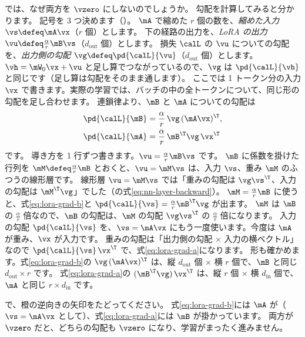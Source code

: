 では、なぜ両方を $\vzero$ にしないのでしょうか。
勾配を計算してみると分かります。
記号を 3 つ決めます（）。
$\mA$ で縮めた $r$ 個の数を、\emph{縮めた入力} $\vs\defeq\mA\vx$（$r$ 個）とします。
下の経路の出力を、\emph{LoRA の出力} $\vu\defeq\frac{\alpha}{r}\mB\vs$（$d_{\text{out}}$ 個）とします。
損失 $\calL$ の $\vu$ についての勾配を、\emph{出力側の勾配} $\vg\defeq\pd{\calL}{\vu}$（$d_{\text{out}}$ 個）とします。
$\vh=\mW_0\vx+\vu$ と足し算でつながっているので、$\vg$ は $\pd{\calL}{\vh}$ と同じです（足し算は勾配をそのまま通します）。
ここでは 1 トークン分の入力 $\vx$ で書きます。実際の学習では、バッチの中の全トークンについて、同じ形の勾配を足し合わせます。
連鎖律より、$\mB$ と $\mA$ についての勾配は
\begin{align}
\pd{\calL}{\mB}&=\frac{\alpha}{r}\,\vg\,(\mA\vx)^\T, \label{eq:lora-grad-b}\\
\pd{\calL}{\mA}&=\frac{\alpha}{r}\,\mB^\T\vg\,\vx^\T \label{eq:lora-grad-a}
\end{align}
です。
導き方を 1 行ずつ書きます。$\vu=\frac{\alpha}{r}\mB\vs$ です。
$\mB$ に係数を掛けた行列を $\mM\defeq\frac{\alpha}{r}\mB$ とおくと、$\vu=\mM\vs$ は、入力 $\vs$、重み $\mM$ のふつうの線形層です。
線形層 $\vu=\mM\vs$ では「重みの勾配は $\vg\vs^\T$、入力の勾配は $\mM^\T\vg$」でした（の式\eqref{eq:nn-layer-backward}）。
$\mM=\frac{\alpha}{r}\mB$ に使うと、式\eqref{eq:lora-grad-b}と $\pd{\calL}{\vs}=\frac{\alpha}{r}\mB^\T\vg$ が出ます。
$\mM$ は $\mB$ の $\frac{\alpha}{r}$ 倍なので、$\mB$ の勾配は、$\mM$ の勾配 $\vg\vs^\T$ の $\frac{\alpha}{r}$ 倍になります。
入力の勾配 $\pd{\calL}{\vs}$ を、$\vs=\mA\vx$ にもう一度使います。今度は $\mA$ が重み、$\vx$ が入力です。
重みの勾配は「出力側の勾配 × 入力の横ベクトル」なので $\pd{\calL}{\vs}\,\vx^\T$ で、式\eqref{eq:lora-grad-a}になります。
形も確かめます。式\eqref{eq:lora-grad-b}の $\vg\,(\mA\vx)^\T$ は、縦 $d_{\text{out}}$ 個 × 横 $r$ 個で、$\mB$ と同じ $d_{\text{out}}\times r$ です。
式\eqref{eq:lora-grad-a}の $(\mB^\T\vg)\,\vx^\T$ は、縦 $r$ 個 × 横 $d_{\text{in}}$ 個で、$\mA$ と同じ $r\times d_{\text{in}}$ です。

で、橙の逆向きの矢印をたどってください。
式\eqref{eq:lora-grad-b}には $\mA$ が（$\vs=\mA\vx$ として）、式\eqref{eq:lora-grad-a}には $\mB$ が掛かっています。
両方が $\vzero$ だと、どちらの勾配も $\vzero$ になり、学習がまったく進みません。

